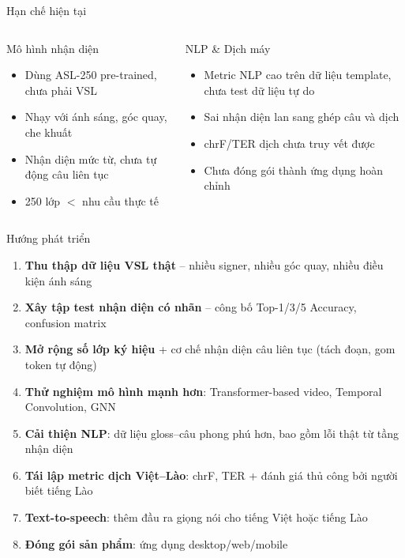 ﻿\documentclass[aspectratio=169, 11pt]{beamer}
\begin{document}
\begin{frame}{Hạn chế hiện tại}
    \begin{columns}[T]
        \begin{alertblock}{Mô hình nhận diện}
            \begin{itemize}\small
                \item Dùng ASL-250 pre-trained, chưa phải VSL
                \item Nhạy với ánh sáng, góc quay, che khuất
                \item Nhận diện mức từ, chưa tự động câu liên tục
                \item 250 lớp $<$ nhu cầu thực tế
            \end{itemize}
        \end{alertblock}

        \begin{alertblock}{NLP \& Dịch máy}
            \begin{itemize}\small
                \item Metric NLP cao trên dữ liệu template, chưa test dữ liệu tự do
                \item Sai nhận diện lan sang ghép câu và dịch
                \item chrF/TER dịch chưa truy vết được
                \item Chưa đóng gói thành ứng dụng hoàn chỉnh
            \end{itemize}
        \end{alertblock}
    \end{columns}
\end{frame}

\begin{frame}{Hướng phát triển}
    \begin{enumerate}
        \item \textbf{Thu thập dữ liệu VSL thật} -- nhiều signer, nhiều góc quay, nhiều điều kiện ánh sáng
        \item \textbf{Xây tập test nhận diện có nhãn} -- công bố Top-1/3/5 Accuracy, confusion matrix
        \item \textbf{Mở rộng số lớp ký hiệu} + cơ chế nhận diện câu liên tục (tách đoạn, gom token tự động)
        \item \textbf{Thử nghiệm mô hình mạnh hơn}: Transformer-based video, Temporal Convolution, GNN
        \item \textbf{Cải thiện NLP}: dữ liệu gloss--câu phong phú hơn, bao gồm lỗi thật từ tầng nhận diện
        \item \textbf{Tái lập metric dịch Việt--Lào}: chrF, TER + đánh giá thủ công bởi người biết tiếng Lào
        \item \textbf{Text-to-speech}: thêm đầu ra giọng nói cho tiếng Việt hoặc tiếng Lào
        \item \textbf{Đóng gói sản phẩm}: ứng dụng desktop/web/mobile
    \end{enumerate}
\end{frame}
\end{document}
